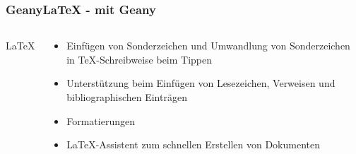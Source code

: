 \documentclass[compress]{beamer}
\begin{document}

\begin{frame}
	\frametitle{GeanyLaTeX - \LaTeXe mit Geany}
	\begin{columns}[c]
		\column[c]{2cm}
			\huge \LaTeX
		\column{8cm}
			\begin{block}{}
				\begin{itemize}
					\item Einfügen von Sonderzeichen und Umwandlung von
						  Sonderzeichen in \TeX-Schreibweise beim Tippen
					\item Unterstützung beim Einfügen von Lesezeichen,
						  Verweisen und bibliographischen Einträgen
					\item Formatierungen
					\item \LaTeX-Assistent zum schnellen Erstellen von
						  Dokumenten
				\end{itemize}
			\end{block}
	\end{columns}
\end{frame}

\end{document}
